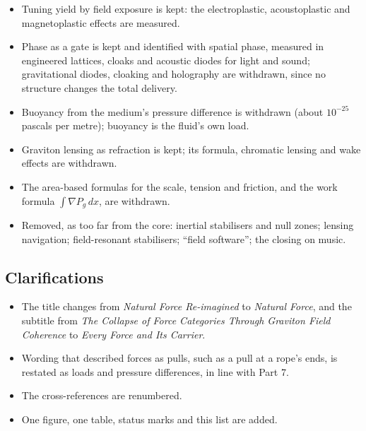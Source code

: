 \begin{itemize}
\item Tuning yield by field exposure is kept: the electroplastic, acoustoplastic and magnetoplastic effects are measured.
\item Phase as a gate is kept and identified with spatial phase, measured in engineered lattices, cloaks and acoustic diodes for light and sound; gravitational diodes, cloaking and holography are withdrawn, since no structure changes the total delivery.
\item Buoyancy from the medium's pressure difference is withdrawn (about $10^{-25}$ pascals per metre); buoyancy is the fluid's own load.
\item Graviton lensing as refraction is kept; its formula, chromatic lensing and wake effects are withdrawn.
\item The area-based formulas for the scale, tension and friction, and the work formula $\int\nabla P_g\,dx$, are withdrawn.
\item Removed, as too far from the core: inertial stabilisers and null zones; lensing navigation; field-resonant stabilisers; ``field software''; the closing on music.
\end{itemize}

\subsection*{Clarifications}
\begin{itemize}
\item The title changes from \textit{Natural Force Re-imagined} to \textit{Natural Force}, and the subtitle from \textit{The Collapse of Force Categories Through Graviton Field Coherence} to \textit{Every Force and Its Carrier}.
\item Wording that described forces as pulls, such as a pull at a rope's ends, is restated as loads and pressure differences, in line with Part 7.
\item The cross-references are renumbered.
\item One figure, one table, status marks and this list are added.
\end{itemize}

\nocite{rashadaPart14,rashadaPart15,rashadaPart17,rashadaPart26}


